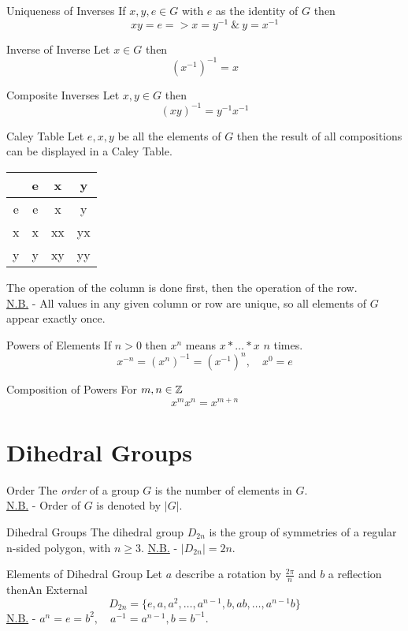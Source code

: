 \documentclass[11pt,a4paper]{article}
\begin{document}
\subtitle{Proposition 3.4 - }{Uniqueness of Inverses}
If $x, y, e \in G$ with $e$ as the identity of $G$ then $$xy = e => x = y^{-1}\ \&\ y = x^{-1}$$

\subtitle{Proposition 3.5 - }{Inverse of Inverse}
Let $x \in G$ then $$(x^{-1})^{-1} = x$$

\subtitle{Proposition 3.6 - }{Composite Inverses}
Let $x, y \in G$ then $$(xy)^{-1} = y^{-1}x^{-1}$$

\subtitle{Definition 3.7 - }{Caley Table}
Let $e, x, y$ be all the elements of $G$ then the result of all compositions can be displayed in a Caley Table.
\begin{center}
\begin{tabular}{c|ccc}
 & e & x & y \\
 \hline
 e & e & x & y \\
 x & x & xx & yx \\
 y & y & xy & yy
\end{tabular}
\end{center}
The operation of the column is done first, then the operation of the row.\\
\underline{N.B.} - All values in any given column or row are unique, so all elements of $G$ appear exactly once.\\

\subtitle{Definition 3.8 - }{Powers of Elements}
If $n > 0$ then $x^n$ means $x * \dots * x$ $n$ times. $$x^{-n} = (x^{n})^{-1} = (x^{-1})^n,\quad x^0 = e$$

\subtitle{Definition 3.9 - }{Composition of Powers}
For $m,n \in \mathbb{Z}$ $$x^mx^n = x^{m+n}$$

\section{Dihedral Groups}

\subtitle{Definition 4.01 - }{Order}
The \textit{order} of a group $G$ is the number of elements in $G$.\\
\underline{N.B.} - Order of $G$ is denoted by $|G|$.\\

\subtitle{Definition 4.02 - }{Dihedral Groups}
The dihedral group $D_{2n}$ is the group of symmetries of a regular n-sided polygon, with $n \geq 3$.
\underline{N.B.} - $|D_{2n}| = 2n$.\\

\subtitle{Proposition 4.03 - }{Elements of Dihedral Group}
Let $a$ describe a rotation by $\frac{2\pi}{n}$ and $b$ a reflection thenAn External
$$D_{2n} = \{ e, a, a^2, \dots, a^{n-1}, b, ab , \dots , a^{n-1}b\}$$
\underline{N.B.} - $a^n = e = b^2,\quad a^{-1} = a^{n-1}, b = b^{-1}$.\\
\end{document}
